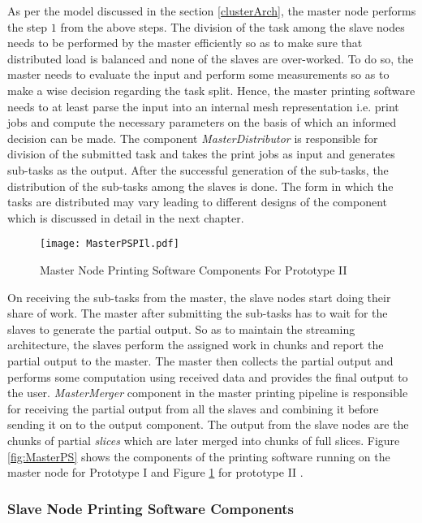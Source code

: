 As per the model discussed in the section \ref{clusterArch}, the master node performs the step $1$ from the above steps. The division of the task among the slave nodes needs to be performed by the master efficiently so as to make sure that distributed load is balanced and none of the slaves are over-worked. To do so, the master needs to evaluate the input and perform some measurements so as to make a wise decision regarding the task split. Hence, the master printing software needs to at least parse the input into an internal mesh representation i.e. print jobs and compute the necessary parameters on the basis of which an informed decision can be made. The component \textit{MasterDistributor} is responsible for division of the submitted task and takes the print jobs as input and generates sub-tasks as the output. After the successful generation of the sub-tasks, the distribution of the sub-tasks among the slaves is done. The form in which the tasks are distributed may vary leading to different designs of the component which is discussed in detail in the next chapter. 

\begin{figure}[t]
\centering
\texttt{[image: MasterPSPIl.pdf]}
\caption{Master Node Printing Software Components For Prototype II}
\label{fig:MasterPSII}
\end{figure}

On receiving the sub-tasks from the master, the slave nodes start doing their share of work. The master after submitting the sub-tasks has to wait for the slaves to generate the partial output. So as to maintain the streaming architecture, the slaves perform the assigned work in chunks and report the partial output to the master. The master then collects the partial output and performs some computation using received data and provides the final output to the user. \textit{MasterMerger} component in the master printing pipeline is responsible for receiving the partial output from all the slaves and combining it before sending it on to the output component. The output from the slave nodes are the chunks of partial \textit{slices} which are later merged into chunks of full slices. Figure \ref{fig:MasterPS} shows the components of the printing software running on the master node for Prototype I and Figure \ref{fig:MasterPSII} for prototype II .

\subsubsection{Slave Node Printing Software Components }

